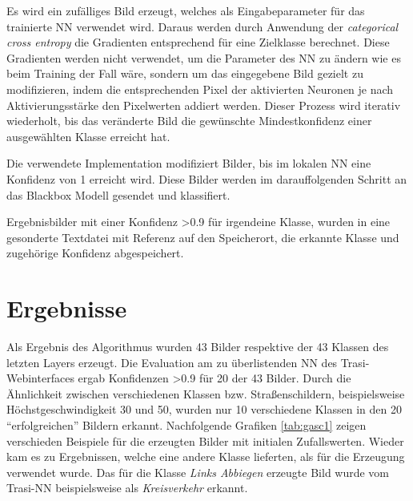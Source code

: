 Es wird ein zufälliges Bild erzeugt, welches als Eingabeparameter für das trainierte NN verwendet wird. 
Daraus werden durch Anwendung der \textit{categorical cross entropy} die Gradienten entsprechend für eine Zielklasse berechnet. Diese Gradienten werden nicht verwendet, um die Parameter des NN zu ändern wie es beim Training der Fall wäre, sondern um das eingegebene Bild gezielt zu modifizieren, indem die entsprechenden Pixel der aktivierten Neuronen je nach Aktivierungsstärke den Pixelwerten addiert werden.
Dieser Prozess wird iterativ wiederholt, bis das veränderte Bild die gewünschte Mindestkonfidenz einer ausgewählten Klasse erreicht hat. 

Die verwendete Implementation modifiziert Bilder, bis im lokalen NN eine Konfidenz von 1 erreicht wird. Diese Bilder werden im darauffolgenden Schritt an das Blackbox Modell gesendet und klassifiert. 

Ergebnisbilder mit einer Konfidenz >0.9 für irgendeine Klasse, wurden in eine gesonderte Textdatei mit Referenz auf den Speicherort, die erkannte Klasse und zugehörige Konfidenz abgespeichert.

%
%

\section{Ergebnisse}
Als Ergebnis des Algorithmus wurden 43 Bilder respektive der 43 Klassen des letzten Layers erzeugt. Die Evaluation am zu überlistenden NN des Trasi-Webinterfaces ergab Konfidenzen >0.9 für 20 der 43 Bilder. Durch die Ähnlichkeit zwischen verschiedenen Klassen bzw. Straßenschildern, beispielsweise Höchstgeschwindigkeit 30 und 50, wurden nur 10 verschiedene Klassen in den 20 "`erfolgreichen"' Bildern erkannt.
Nachfolgende Grafiken \ref{tab:gasc1} zeigen verschieden Beispiele für die erzeugten Bilder mit initialen Zufallswerten. Wieder kam es zu Ergebnissen, welche eine andere Klasse lieferten, als für die Erzeugung verwendet wurde. Das für die Klasse \textit{Links Abbiegen} erzeugte Bild wurde vom Trasi-NN beispielsweise als \textit{Kreisverkehr} erkannt.

